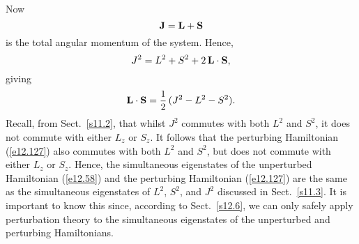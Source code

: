 Now
\begin{equation}
{\bf J} = {\bf L} + {\bf S}
\end{equation}
is the total angular momentum of the system. Hence,
\begin{equation}
J^2 = L^2+S^2+ 2\,{\bf L}\cdot{\bf S},
\end{equation}
giving
\begin{equation}
{\bf L}\cdot {\bf S} = \frac{1}{2}\,(J^2-L^2-S^2).
\end{equation}
Recall, from Sect.~\ref{s11.2}, that whilst $J^2$ commutes with both $L^2$
and $S^2$, it does not commute with either $L_z$ or $S_z$. It follows
that the perturbing Hamiltonian (\ref{e12.127}) also commutes with both $L^2$ and $S^2$,  but does not commute with either $L_z$ or $S_z$.
Hence, the simultaneous eigenstates of the unperturbed Hamiltonian (\ref{e12.58})
and the perturbing Hamiltonian (\ref{e12.127}) are the same as the simultaneous
eigenstates of $L^2$, $S^2$, and $J^2$ discussed in Sect.~\ref{s11.3}.
It is important to know this since, according to Sect.~\ref{s12.6}, we
can only safely apply perturbation theory to the simultaneous
eigenstates of the unperturbed and perturbing Hamiltonians.

